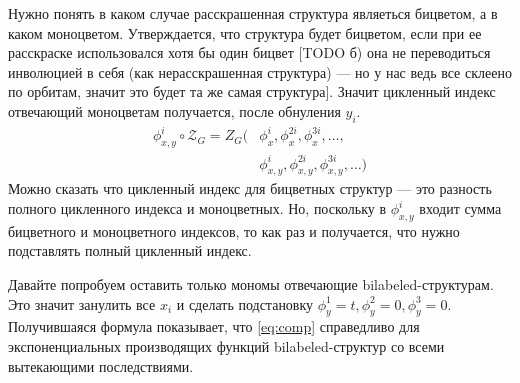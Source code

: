 Нужно понять в каком случае расскрашенная структура являеться бицветом, а в
каком моноцветом. Утверждается, что структура будет бицветом, если при ее
расскраске использовался хотя бы один бицвет [TODO б) она не переводиться
инволюцией в себя (как нерасскрашенная структура) --- но у нас ведь все
склеено по орбитам, значит это будет та же самая структура]. Значит цикленный
индекс отвечающий моноцветам получается, после обнуления $y_i$.
\begin{equation*}
\begin{split}
\phi_{x, y}^i \circ \mathcal Z_G = 
Z_G(&\phi_x^i, \phi_x^{2i}, \phi_x^{3i}, \dots,\\
	&\phi_{x,y}^i, \phi_{x,y}^{2i}, \phi_{x,y}^{3i}, \dots)
\end{split}
\end{equation*}
Можно сказать что цикленный индекс для бицветных структур --- это разность
полного цикленного индекса и моноцветных. Но, поскольку в $\phi_{x,y}^i$ входит
сумма бицветного и моноцветного индексов, то как раз и получается, что нужно
подставлять полный цикленный индекс.

Давайте попробуем оставить только мономы отвечающие bilabeled-структурам. Это
значит занулить все $x_i$ и сделать подстановку $\phi_y^1 = t, \phi_y^2 = 0,
\phi_y^3 = 0$. Получившаяся формула показывает, что \ref{eq:comp} справедливо
для экспоненциальных производящих функций bilabeled-структур со всеми
вытекающими последствиями.
